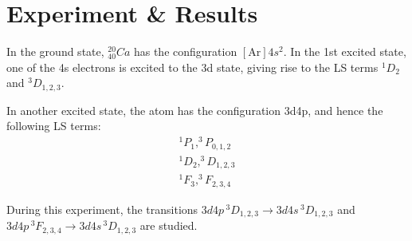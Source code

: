 \documentclass[a4paper]{article}
\begin{document}


\section{Experiment \& Results}
In the ground state, $^{20}_{40}Ca$ has the configuration
$[\mathrm{Ar}]4s^2$. In the 1st excited state, one of the 4s electrons is
excited to the 3d state, giving rise to the LS terms $^1D_2$ and
$^3D_{1,2,3}$.

In another excited state, the atom has the configuration 3d4p, and
hence the following LS terms:
\[
\begin{array}{c}
^1P_1, ^3P_{0, 1, 2}\\
^1D_2, ^3D_{1,2,3} \\
^1F_3, ^3F_{2,3,4}
\end{array}
\]

During this experiment, the transitions $3d4p\,^3D_{1,2,3} \to
3d4s\,^3D_{1,2,3}$ and $3d4p\,^3F_{2,3,4} \to 3d4s\,^3D_{1,2,3}$ are
studied.
\end{document}
